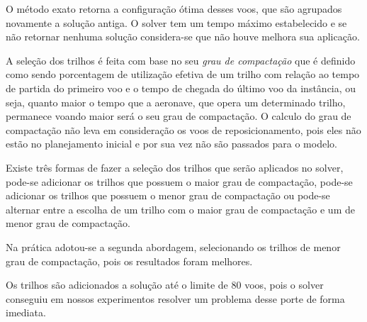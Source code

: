 O método exato retorna a configuração ótima desses voos, que
são agrupados novamente a solução antiga. O solver tem um tempo máximo
estabelecido e se não retornar nenhuma solução considera-se que não houve
melhora sua aplicação.

A seleção dos trilhos é feita com base no seu
\textit{grau de compactação} que é definido como sendo porcentagem de
utilização efetiva de um trilho com relação ao tempo de partida do primeiro voo
e o tempo de chegada do último voo da instância, ou seja, quanto maior o tempo
que a aeronave, que opera um determinado trilho, permanece voando maior será o
seu grau de compactação. O calculo do grau de compactação não leva em
consideração os voos de reposicionamento, pois eles não estão no planejamento
inicial e por sua vez não são passados para o modelo.

Existe três formas de fazer a seleção dos trilhos que serão aplicados no solver,
pode-se adicionar os trilhos que possuem o maior grau de compactação, pode-se
adicionar os trilhos que possuem o menor grau de compactação ou pode-se alternar
entre a escolha de um trilho com o maior grau de compactação e um de menor grau
de compactação.

Na prática adotou-se a segunda abordagem, selecionando os trilhos de menor grau
de compactação, pois os resultados foram melhores.
 
Os trilhos são adicionados a solução até o limite de 80 voos, pois o solver
conseguiu em nossos experimentos resolver um problema desse porte de forma
imediata. 


 
 
